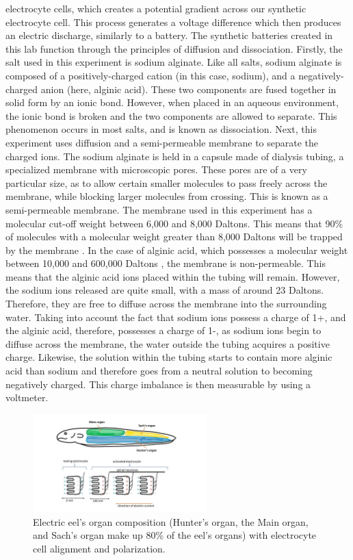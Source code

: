 \documentclass[letterpaper]{article}
\begin{document}
electrocyte cells, which creates a potential gradient across our synthetic electrocyte cell.
This process generates a voltage difference which then produces an electric discharge, 
similarly to a battery. The synthetic batteries created in this lab function through the
principles of diffusion and dissociation. Firstly, the salt used in this experiment is sodium 
alginate. Like all salts, sodium alginate is composed of a positively-charged cation (in this case, sodium),
and a negatively-charged anion (here, alginic acid). These two components are fused together in solid 
form by an ionic bond. However, when placed in an aqueous environment, the ionic bond is broken and 
the two components are allowed to separate. This phenomenon occurs in most salts, and is known as 
dissociation. Next, this experiment uses diffusion and a semi-permeable membrane to separate the charged 
ions. The sodium alginate is held in a capsule made of dialysis tubing, a specialized membrane with 
microscopic pores. These pores are of a very particular size, as to allow certain smaller molecules to 
pass freely across the membrane, while blocking larger molecules from crossing. This is known as a 
semi-permeable membrane. The membrane used in this experiment has a molecular cut-off weight between 
6,000 and 8,000 Daltons. This means that 90\% of molecules with a molecular weight greater than 8,000 
Daltons will be trapped by the membrane \parencite{MolecularWeightCut2014}. In the case of alginic acid, 
which possesses a molecular weight between 10,000 and 600,000 Daltons 
\parencite{MolecularWeightDetermination}, the membrane is non-permeable. This means that the alginic 
acid ions placed within the tubing will remain. However, the sodium ions released are quite small, with 
a mass of around 23 Daltons. Therefore, they are free to diffuse across the membrane into the surrounding 
water. Taking into account the fact that sodium ions possess a charge of 1+, and the alginic acid, 
therefore, possesses a charge of 1-, as sodium ions begin to diffuse across the membrane, the water 
outside the tubing acquires a positive charge. Likewise, the solution within the tubing starts to 
contain more alginic acid than sodium and therefore goes from a neutral solution to becoming 
negatively charged. This charge imbalance is then measurable by using a voltmeter.


\begin{figure}[H]
	\centering
	\includegraphics[width=0.60\textwidth]{fig1.jpg}
	\caption{Electric eel's organ composition (Hunter's organ, the Main organ, and Sach's organ make up 80\% of the eel's organs) with electrocyte cell alignment and polarization.}
	\label{fig:1}
\end{figure}
\end{document}
